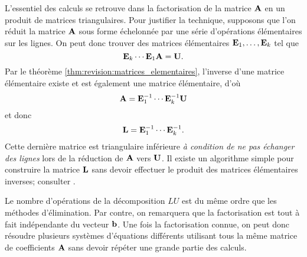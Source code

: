 L'essentiel des calculs se retrouve dans la factorisation de la
matrice $\mathbf{A}$ en un produit de matrices triangulaires. Pour
justifier la technique, supposons que l'on réduit la matrice $\mathbf{A}$
sous forme échelonnée par une série d'opérations élémentaires sur les
lignes. On peut donc trouver des matrices élémentaires $\mathbf{E}_1,
\dots, \mathbf{E}_k$ tel que
\begin{displaymath}
  \mathbf{E}_k \cdots \mathbf{E}_1 \mathbf{A} = \mathbf{U}.
\end{displaymath}
Par le théorème \ref{thm:revision:matrices_elementaires}, l'inverse
d'une matrice élémentaire existe et est également une matrice
élémentaire, d'où
\begin{displaymath}
  \mathbf{A} = \mathbf{E}_1^{-1} \cdots \mathbf{E}_k^{-1} \mathbf{U}
\end{displaymath}
et donc
\begin{displaymath}
  \mathbf{L} = \mathbf{E}_1^{-1} \cdots \mathbf{E}_k^{-1}.
\end{displaymath}
Cette dernière matrice est triangulaire inférieure \emph{à condition
  de ne pas échanger des lignes} lors de la réduction de $\mathbf{A}$
vers $\mathbf{U}$.  Il existe un algorithme simple pour construire la
matrice $\mathbf{L}$ sans devoir effectuer le produit des matrices
élémentaires inverses; consulter \citet[section 9.9]{Anton:linear:8e:2000}.

Le nombre d'opérations de la décomposition $LU$ est du même ordre que
les méthodes d'élimination. Par contre, on remarquera que la
factorisation est tout à fait indépendante du vecteur $\mathbf{b}$. Une
fois la factorisation connue, on peut donc résoudre plusieurs systèmes
d'équations différents utilisant tous la même matrice de coefficients
$\mathbf{A}$ sans devoir répéter une grande partie des calculs.

